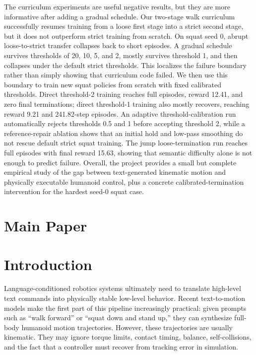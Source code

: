 \documentclass[10pt]{article}
\begin{document}
The curriculum experiments are useful negative results, but they are more informative after adding a gradual schedule. Our two-stage walk curriculum successfully resumes training from a loose first stage into a strict second stage, but it does not outperform strict training from scratch. On squat seed 0, abrupt loose-to-strict transfer collapses back to short episodes. A gradual schedule survives thresholds of 20, 10, 5, and 2, mostly survives threshold 1, and then collapses under the default strict thresholds. This localizes the failure boundary rather than simply showing that curriculum code failed. We then use this boundary to train new squat policies from scratch with fixed calibrated thresholds. Direct threshold-2 training reaches full episodes, reward 12.41, and zero final terminations; direct threshold-1 training also mostly recovers, reaching reward 9.21 and 241.82-step episodes. An adaptive threshold-calibration run automatically rejects thresholds 0.5 and 1 before accepting threshold 2, while a reference-repair ablation shows that an initial hold and low-pass smoothing do not rescue default strict squat training. The jump loose-termination run reaches full episodes with final reward 15.63, showing that semantic difficulty alone is not enough to predict failure. Overall, the project provides a small but complete empirical study of the gap between text-generated kinematic motion and physically executable humanoid control, plus a concrete calibrated-termination intervention for the hardest seed-0 squat case.

\clearpage

\section*{Main Paper}

\section{Introduction}

Language-conditioned robotics systems ultimately need to translate high-level text commands into physically stable low-level behavior. Recent text-to-motion models make the first part of this pipeline increasingly practical: given prompts such as ``walk forward'' or ``squat down and stand up,'' they can synthesize full-body humanoid motion trajectories. However, these trajectories are usually kinematic. They may ignore torque limits, contact timing, balance, self-collisions, and the fact that a controller must recover from tracking error in simulation.
\end{document}
